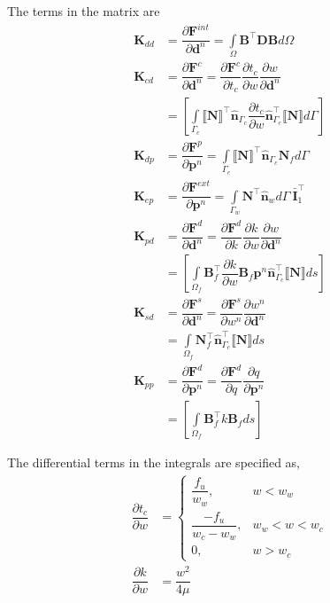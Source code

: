 \documentclass{article}
\begin{document}
The terms in the matrix are
\begin{align}
	\mathbf{K}_{dd} &= \dfrac{\partial \mathbf{F}^{int}}{\partial \mathbf{d}^n}  
	= \int\limits_{\Omega} \mathbf{B}^{\top} \mathbf{D} \mathbf{B} d\Omega
	\\[1.2em]
	\mathbf{K}_{cd} &= \dfrac{\partial \mathbf{F}^{c}}{\partial \mathbf{d}^n} 	
	= \dfrac{\partial \mathbf{F}^{c}}{\partial t_c} \dfrac{\partial t_c}{\partial w} 
	\dfrac{\partial w}{\partial \mathbf{d}^n} \nonumber
	\\
	&=\left[\int\limits_{\Gamma_{c}} \llbracket\mathbf{N}\rrbracket ^{\top} \hat{\mathbf{n}}_{\Gamma_c} 
	\dfrac{\partial t_c}{\partial w}  \hat{\mathbf{n}}_{\Gamma_c}^\top \llbracket \mathbf{N} \rrbracket  d\Gamma \right]
	\\[1.2em]
	\mathbf{K}_{dp} &= \dfrac{\partial \mathbf{F}^{p}}{\partial \mathbf{p}^n}
	= \int\limits_{\Gamma_{c}} \llbracket \mathbf{N} \rrbracket^{\top} \hat{\mathbf{n}}_{\Gamma_c} \mathbf{N}_f d\Gamma 
	\\[1.2em]
	\mathbf{K}_{ep} &= \dfrac{\partial \mathbf{F}^{ext}}{\partial \mathbf{p}^n}
	= \int\limits_{\Gamma_w} \mathbf{N}^{\top} \hat{\mathbf{n}}_{w} d\Gamma \:
	\bar{\mathbf{I}}_1^{\top}
	\\[1.2em]
	\mathbf{K}_{pd} &= \dfrac{\partial \mathbf{F}^d}{\partial \mathbf{d}^n}   
	= \dfrac{\partial \mathbf{F}^d}{\partial k}
	\dfrac{\partial k}{\partial w} 
	\dfrac{\partial w}{\partial \mathbf{d}^n} \nonumber
	\\
	&=  \left[\int\limits_{\Omega_f}
	\mathbf{B}_f^{\top}
	\dfrac{\partial k}{\partial w}  \mathbf{B}_f \mathbf{p}^n \hat{\mathbf{n}}_{\Gamma_c}^\top \llbracket \mathbf{N} \rrbracket ds \right] 		
	\\[1.2em]
	\mathbf{K}_{sd} &= 
	\dfrac{\partial \mathbf{F}^s}{\partial \mathbf{d}^n} 
	= \dfrac{\partial \mathbf{F}^s}{\partial w^n} \dfrac{\partial w^n}{\partial \mathbf{d}^n} \nonumber
	\\
	&= \int\limits_{\Omega_f} \mathbf{N}_f^{\top} \hat{\mathbf{n}}_{\Gamma_c}^{\top} \llbracket \mathbf{N} \rrbracket ds
	\\[1.2em]
	\mathbf{K}_{pp} &= \dfrac{\partial \mathbf{F}^{d}}{\partial \mathbf{p}^n}
	= \dfrac{\partial \mathbf{F}^{d}}{\partial q}
	\dfrac{\partial q}{\partial \mathbf{p}^n} \nonumber
	\\
	&= \left[\int\limits_{\Omega_f} \mathbf{B}_f^{\top} k\mathbf{B}_f ds \right] 
\end{align}


The differential terms in the integrals are specified as,
\begin{align}
	\dfrac{\partial t_c}{\partial w}&= \begin{cases}
		\dfrac{f_u}{w_w}, & w < w_w
		\\[1.2em]
		\dfrac{-f_u}{w_c-w_w}, & w_w < w < w_c
		\\[1.2em]
		0, & w > w_c
	\end{cases}
	\\[1.2em]
	\dfrac{\partial k}{\partial w} &= \dfrac{w^2}{4 \mu}
\end{align}
\end{document}
